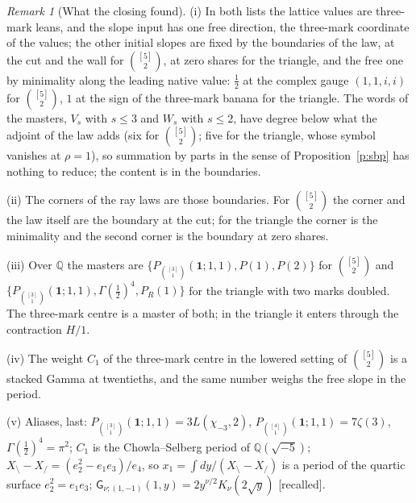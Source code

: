 \documentclass[11pt]{article}
\newcommand{\one}{\mathbf 1}
\newcommand{\sG}{\mathsf G}
\newcommand{\Pth}{P_{\binom{[3]}1}(\one;1,1)}
\newcommand{\Pfour}{P_{\binom{[4]}1}(\one;1,1)}
\theoremstyle{plain}
\theoremstyle{definition}
\theoremstyle{remark}
\newtheorem{remark}[proposition]{Remark}
\newcommand{\recalled}{\textup{[recalled]}}
\begin{document}
\begin{remark}[What the closing found]\label{r:closingfound}
(i) In both lists the lattice values are three-mark leans, and the slope input has one free direction, the three-mark coordinate of the values; the other initial slopes are fixed by the boundaries of the law, at the cut and the wall for $\binom{[5]}2$, at zero shares for the triangle, and the free one by minimality along the leading native value: $\frac12$ at the complex gauge $(1,1,i,i)$ for $\binom{[5]}2$, $1$ at the sign of the three-mark banana for the triangle. The words of the masters, $V_s$ with $s\le3$ and $W_s$ with $s\le2$, have degree below what the adjoint of the law adds (six for $\binom{[5]}2$; five for the triangle, whose symbol vanishes at $\rho=1$), so summation by parts in the sense of Proposition~\ref{p:sbp} has nothing to reduce; the content is in the boundaries.

(ii) The corners of the ray laws are those boundaries. For $\binom{[5]}2$ the corner and the law itself are the boundary at the cut; for the triangle the corner is the minimality and the second corner is the boundary at zero shares.

(iii) Over $\mathbb Q$ the masters are $\{\Pth,P(1),P(2)\}$ for $\binom{[5]}2$ and $\{\Pth,\Gamma(\frac12)^4,P_R(1)\}$ for the triangle with two marks doubled. The three-mark centre is a master of both; in the triangle it enters through the contraction $H/1$.

(iv) The weight $C_1$ of the three-mark centre in the lowered setting of $\binom{[5]}2$ is a stacked Gamma at twentieths, and the same number weighs the free slope in the period.

(v) Aliases, last: $\Pth=3L(\chi_{-3},2)$, $\Pfour=7\zeta(3)$, $\Gamma(\frac12)^4=\pi^2$; $C_1$ is the Chowla--Selberg period of $\mathbb Q(\sqrt{-5})$; $X_{\setminus}-X_{/}=(e_2^2-e_1e_3)/e_4$, so $x_1=\int dy/(X_{\setminus}-X_{/})$ is a period of the quartic surface $e_2^2=e_1e_3$; $\sG_{\nu;(1,-1)}(1,y)=2y^{\nu/2}K_\nu(2\sqrt y)$ \recalled.
\end{remark}
\end{document}
